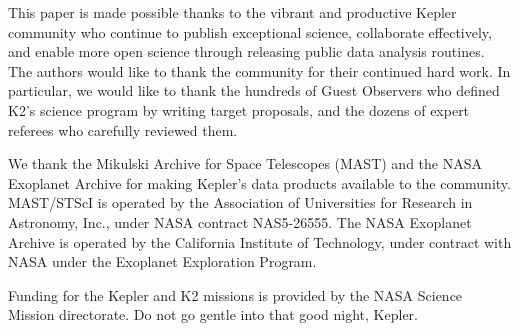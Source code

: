 \documentclass[modern]{aastex62}
\begin{document}
This paper is made possible thanks to the vibrant and productive Kepler community who continue to publish exceptional science, collaborate effectively, and enable more open science through releasing public data analysis routines. The authors would like to thank the community for their continued hard work. In particular, we would like to thank the hundreds of Guest Observers who defined K2's science program by writing target proposals, and the dozens of expert referees who carefully reviewed them.

We thank the Mikulski Archive for Space Telescopes (MAST) and the NASA Exoplanet Archive for making Kepler's data products available to the community. MAST/STScI is operated by the Association of Universities for Research in Astronomy, Inc., under NASA contract NAS5-26555. The NASA Exoplanet Archive is operated by the California Institute of Technology, under contract with NASA under the Exoplanet Exploration Program.

Funding for the Kepler and K2 missions is provided by the NASA Science Mission directorate. Do not go gentle into that good night, Kepler.

\vspace{5mm}
\end{document}
